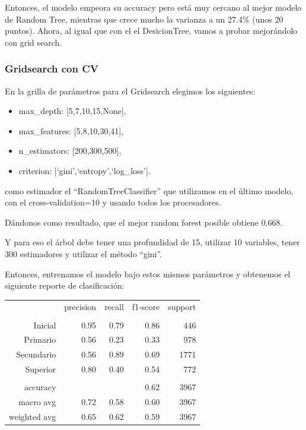 \documentclass[a4paper]{article}
\begin{document}
            Entonces, el modelo empeora su accuracy pero está muy cercano al mejor modelo de Random Tree, mientras que crece mucho la varianza a un 27.4\% (unos 20 puntos). Ahora, al igual que con el el DesicionTree, vamos a probar mejorándolo con grid search.

        \subsubsection{Gridsearch con CV}

            En la grilla de parámetros para el Gridsearch elegimos los siguientes:
            \begin{itemize}
                \item max\_depth: [5,7,10,15,None],
                \item max\_features: [5,8,10,30,41],
                \item n\_estimators: [200,300,500],
                \item criterion: [`gini',`entropy',`log\_loss'].
            \end{itemize}
            como estimador el ``RandomTreeClassifier'' que utilizamos en el último modelo, con el cross-validation=10 y  usando todos los procesadores.

            Dándonos como resultado, que el mejor random forest posible obtiene 0.668. 

            Y para eso el árbol debe tener una profundidad de 15, utilizar  10  variables, tener  300  estimadores y utilizar el método ``gini''.
            
            Entonces, entrenamos el modelo bajo estos mismos parámetros y obtenemos el siguiente reporte de clasificación:

            \begin{table}[!ht]
                \centering
                \begin{tabular}{rrrrr}
                    ~ & precision & recall & f1-score & support \\
                    & & & & \\
                    Inicial    & 0.95 & 0.79 & 0.86 & 446 \\
                    Primario   & 0.56 & 0.23 & 0.33 & 978 \\
                    Secundario & 0.56 & 0.89 & 0.69 & 1771 \\
                    Superior   & 0.80 & 0.40 & 0.54 & 772 \\
                    & & & & \\
                    accuracy & & & 0.62 & 3967 \\
                    macro avg & 0.72 & 0.58 & 0.60 & 3967 \\
                    weighted avg & 0.65 & 0.62 & 0.59 & 3967 \\
                \end{tabular}
            \end{table}
            
\end{document}

